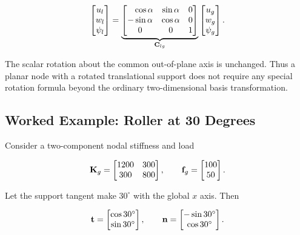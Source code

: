 \begin{equation}
    \begin{bmatrix}
        u_l\\
        w_l\\
        \psi_l
    \end{bmatrix}
    =
    \underbrace{
    \begin{bmatrix}
        \phantom{-}\cos\alpha&\sin\alpha&0\\
        -\sin\alpha&\cos\alpha&0\\
        0&0&1
    \end{bmatrix}}_{\mathbf{C}_{lg}}
    \begin{bmatrix}
        u_g\\
        w_g\\
        \psi_g
    \end{bmatrix}.
\end{equation}

The scalar rotation about the common out-of-plane axis is unchanged. Thus a
planar node with a rotated translational support does not require any special
rotation formula beyond the ordinary two-dimensional basis transformation.

\subsection{Worked Example: Roller at 30 Degrees}

Consider a two-component nodal stiffness and load

\begin{equation}
    \mathbf{K}_g
    =
    \begin{bmatrix}
        1200&300\\
        300&800
    \end{bmatrix},
    \qquad
    \mathbf{f}_g
    =
    \begin{bmatrix}
        100\\50
    \end{bmatrix}.
\end{equation}

Let the support tangent make $30^\circ$ with the global $x$ axis. Then

\begin{equation}
    \mathbf{t}
    =
    \begin{bmatrix}
        \cos30^\circ\\\sin30^\circ
    \end{bmatrix},
    \qquad
    \mathbf{n}
    =
    \begin{bmatrix}
        -\sin30^\circ\\\cos30^\circ
    \end{bmatrix}.
\end{equation}

